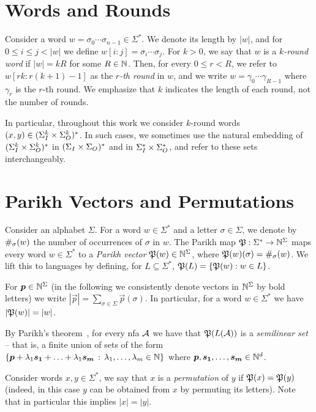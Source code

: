 
\section*{Words and Rounds}
Consider a word $w=\sigma_0\cdots \sigma_{n-1}\in \Sigma^*$. We denote its length by $|w|$, and for $0\le i\le j< |w|$ we define $w[i:j]=\sigma_i\cdots \sigma_j$. 
For $k>0$, we say that $w$ is a \emph{$k$-round word} if $|w|=kR$ for some $R\in \mathbb{N}$. Then, for every $0\le r<R$, we refer to $w[rk:r(k+1)-1]$ as the \emph{$r$-th round} in $w$, and we write $w=\gamma_0\cdots \gamma_{R-1}$ where $\gamma_r$ is the $r$-th round. We emphasize that $k$ indicates the length of each round, not the number of rounds.

In particular, throughout this work we consider $k$-round words $(x,y)\in (\Sigma_{I}^k\times \Sigma_{O}^k)^*$. In such cases, we sometimes use the natural embedding of $(\Sigma_{I}^k\times \Sigma_{O}^k)^*$ in $(\Sigma_{I}\times \Sigma_{O})^*$ and in $\Sigma_{I}^*\times \Sigma_{O}^*$, and refer to these sets interchangeably.

\section*{Parikh Vectors and Permutations}
Consider an alphabet $\Sigma$. For a word $w\in \Sigma^*$ and a letter $\sigma\in \Sigma$, we denote by $\#_\sigma(w)$ the number of occurrences of $\sigma$ in $w$. 
The Parikh map
$\mathfrak{P}:\Sigma^*\to \mathbb{N}^\Sigma$ maps every word $w\in \Sigma^*$ to a \emph{Parikh vector} $\mathfrak{P}(w)\in \mathbb{N}^\Sigma$, where $\mathfrak{P}(w)(\sigma)=\#_\sigma(w)$. We lift this to languages by defining, for $L\subseteq \Sigma^*$, $\mathfrak{P}(L)=\{\mathfrak{P}(w):w\in L\}$. 

For $\boldsymbol{p}\in \mathbb{N}^\Sigma$ (in the following we consistently denote vectors in $\mathbb{N}^\Sigma$ by bold letters) we write $|\vec{p}|=\sum_{\sigma\in \Sigma}\vec{p}(\sigma)$. In particular, for a word $w\in \Sigma^*$ we have $|\mathfrak{P}(w)|=|w|$.

By Parikh's theorem~\cite{Parikh1966}, for every \gls{nfa} $\mathcal{A}$ we have that $\mathfrak{P}(L(\mathcal{A}))$ is a \emph{semilinear set} -- that is, a finite union of sets of the form $\{\boldsymbol{p}+\lambda_1 \boldsymbol{s_1}+\ldots+\lambda_1 \boldsymbol{s_m}\, :\, \lambda_1,\ldots,\lambda_m\in \mathbb{N}\}$ where $\boldsymbol{p},\boldsymbol{s_1},\ldots,\boldsymbol{s_m}\in \mathbb{N}^d$.

Consider words $x,y\in \Sigma^*$, we say that $x$ is a \emph{permutation} of $y$ if $\mathfrak{P}(x)=\mathfrak{P}(y)$ (indeed, in this case $y$ can be obtained from $x$ by permuting its letters). Note that in particular this implies $|x|=|y|$.
